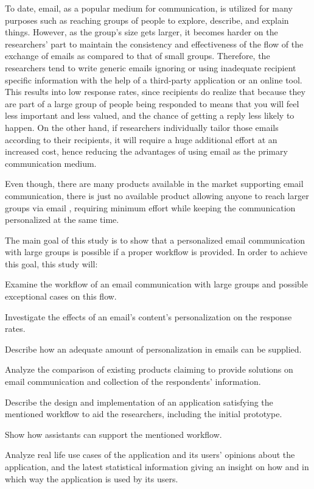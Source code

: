 To date, email, as a popular medium for communication, is utilized for many purposes such as reaching groups of people to explore, describe, and explain things. However, as the group's size gets larger, it becomes harder on the researchers' part to maintain the consistency and effectiveness of the flow of the exchange of emails as compared to that of small groups. Therefore, the researchers tend to write generic emails ignoring or using inadequate recipient specific information with the help of a third-party application or an online tool. This results into low response rates, since recipients do realize that because they are part of a large group of people being responded to means that you will feel less important and less valued, and the chance of getting a reply less likely to happen. On the other hand, if researchers individually tailor those emails according to their recipients, it will require a huge additional effort at an increased cost, hence reducing the advantages of using email as the primary communication medium.
\vspace{1cm}

Even though, there are many products available in the market supporting email communication, there is just no available product allowing anyone to reach larger groups via email , requiring minimum effort while keeping the communication personalized at the same time.
\vspace{1cm}

The main goal of this study is to show that a personalized email communication with large groups is possible if a proper workflow is provided. In order to achieve this goal, this study will:

\begin{compactenum}
	\item Examine the workflow of an email communication with large groups and possible exceptional cases on this flow.
	\item Investigate the effects of an email's content's personalization on the response rates.
	\item Describe how an adequate amount of personalization in emails can be supplied.
	\item Analyze the comparison of  existing products claiming to provide solutions on email communication and collection of the respondents' information.
	\item Describe the design and implementation of an application satisfying the mentioned workflow to aid the researchers, including the initial prototype.
	\item Show how assistants can support the mentioned workflow. 
	\item Analyze real life use cases of the application and its users' opinions about the application, and the latest statistical information giving an insight on how and in which way the application is used by its users.
\end{compactenum}
\vspace{1cm}

